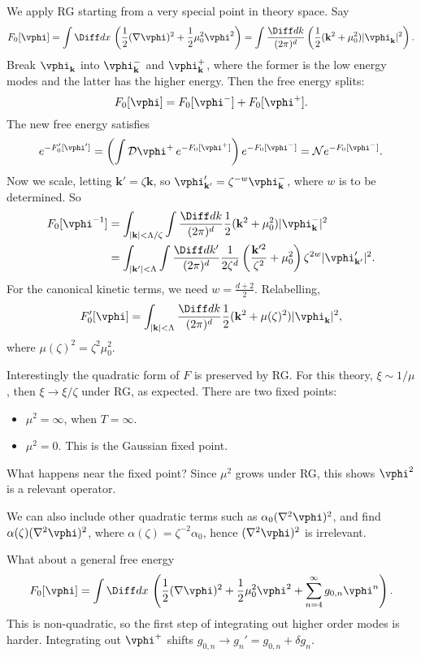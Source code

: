 \documentclass[12pt]{article}
\begin{document}
We apply RG starting from a very special point in theory space. Say
\[
	F_0[\vphi] = \int \Diff d x\, \left( \frac{1}{2} (\nabla \vphi)^2 + \frac{1}{2} \mu_0^2 \vphi^2 \right) = \int \frac{\Diff d k}{(2 \pi)^{d}} \left( \frac{1}{2}(\mathbf{k}^2 + \mu_0^2) |\vphi_{\mathbf{k}}|^2 \right).
\]
Break $\vphi_{\mathbf{k}}$ into $\vphi_{\mathbf{k}}^{-}$ and $\vphi_{\mathbf{k}}^+$, where the former is the low energy modes and the latter has the higher energy. Then the free energy splits:
\[
	F_0[\vphi] = F_0[\vphi^{-}] + F_0[\vphi^{+}].
\]
The new free energy satisfies
\[
	e^{-F_0'[\vphi']} = \left( \int \mathcal{D} \vphi^{+} \, e^{-F_0[\vphi^{+}]} \right) e^{-F_0[\vphi^{-}]} = \mathcal{N} e^{-F_0[\vphi^{-}]}.
\]
Now we scale, letting $\mathbf{k}' = \zeta \mathbf{k}$, so $\vphi'_{\mathbf{k}'} = \zeta^{-w} \vphi_{\mathbf{k}}^{-}$, where $w$ is to be determined. So
\begin{align*}
	F_0[\vphi^{-1}] &= \int_{|\mathbf{k}| < \Lambda/\zeta} \int \frac{\Diff d k}{(2 \pi)^{d}} \frac{1}{2} (\mathbf{k}^2 + \mu_0^2) |\vphi_{\mathbf{k}}^{-}|^2 \\
			&= \int_{|\mathbf{k}'| < \Lambda} \int \frac{\Diff d k'}{(2 \pi)^{d}} \frac{1}{2 \zeta^{d}} \left( \frac{\mathbf{k}'^2}{\zeta^2} + \mu_0^2 \right) \zeta^{2w} |\vphi_{\mathbf{k}'}'|^2.
\end{align*}
For the canonical kinetic terms, we need $w = \frac{d+2}{2}$. Relabelling,
\[
	F_0'[\vphi] = \int_{|\mathbf{k}| < \Lambda} \frac{\Diff d k}{(2 \pi)^{d}} \frac{1}{2} (\mathbf{k}^2 + \mu(\zeta)^2) |\vphi_{\mathbf{k}}|^2,
\]
where $\mu(\zeta)^2 = \zeta^2 \mu_0^2$.

Interestingly the quadratic form of $F$ is preserved by RG. For this theory, $\xi \sim 1/\mu$, then $\xi \to \xi/\zeta$ under RG, as expected. There are two fixed points:
\begin{itemize}
	\item $\mu^2 = \infty$, when $T = \infty$.
	\item $\mu^2 = 0$. This is the Gaussian fixed point.
\end{itemize}

What happens near the fixed point? Since $\mu^2$ grows under RG, this shows $\vphi^2$ is a relevant operator.

We can also include other quadratic terms such as $\alpha_0(\nabla^2 \vphi)^2$, and find $\alpha(\zeta)(\nabla^2 \vphi)^2$, where $\alpha(\zeta) = \zeta^{-2} \alpha_0$, hence $(\nabla^2 \vphi)^2$ is irrelevant.

What about a general free energy
\[
	F_0[\vphi] = \int \Diff d x \, \left( \frac{1}{2} (\nabla \vphi)^2 + \frac{1}{2} \mu_0^2 \vphi^2 + \sum_{n = 4}^{\infty} g_{0, n} \vphi^{n} \right).
\]
This is non-quadratic, so the first step of integrating out higher order modes is harder. Integrating out $\vphi^{+}$ shifts $g_{0, n} \to g_n' = g_{0,n} + \delta g_n$.
\end{document}
